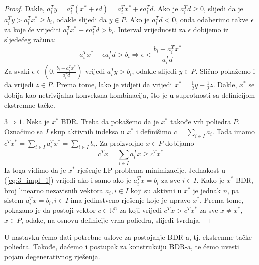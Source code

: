 \documentclass[b5paper, utf8, 11pt, colorlinks]{book}
\theoremstyle{definition}
\begin{document}
\begin{proof}
       Dakle, $a_i^T y = a_i^T (x^* + \epsilon d) = a_i^T x^* + \epsilon a_i^T d $. Ako je $a_i^T d \geq 0$, slijedi da je 
       $a_i^T y > a_i^Tx^* \geq b_i$, odakle slijedi da   $y \in  P$. Ako je $a_i^T d < 0$, onda odaberimo takve $\epsilon$ za koje će vrijediti $a_i^T x^* + \epsilon a_i^T d > b_i$. Interval   vrijednosti za $\epsilon$ dobijemo iz sljedećeg računa:
       $$ a_i^T x^* + \epsilon a_i^T d > b_i \Rightarrow \epsilon < \frac{b_i - a_i^T x^*}{a_i^T d}  $$
       Za svaki $\epsilon \in \left(0,  \frac{b_i - a_i^T x^*}{a_i^T d} \right)$ vrijedi $a_i^T y > b_i$, odakle slijedi $y \in P$. Slično pokažemo i da vrijedi $z \in P$. 
       Prema tome, lako je vidjeti da vrijedi $x^* = \frac{1}{2}y +\frac{1}{2} z$. Dakle, $x^*$ se dobija kao netrivijalna konveksna kombinacija, što je u suprotnosti sa definicijom ekstremne tačke. 
       
       $3 \Rightarrow 1$. Neka je $x^*$ BDR. Treba da pokažemo da je  $x^*$  takođe vrh poliedra $P$. Označimo sa $I$ skup aktivnih indeksa u $x^*$ i definišimo $c = \sum_{i \in I} a_i$.  Tada imamo 
       $ c^T x^* = \sum_{i \in I } a_i^T x^* = \sum_{i \in I} b_i$. Za proizvoljno $x \in P$ dobijamo
       \begin{equation}\label{eq:3_impl_1}
          c^T x = \sum_{i \in I} a_i^T x \geq c^T x^*  
       \end{equation}
     Iz toga vidimo da je $x^*$ rješenje LP problema minimizacije. Jednakost u (\ref{eq:3_impl_1}) vrijedi ako i samo ako je $a_i^T x = b_i$ za sve $i \in I$. Kako je $x^*$ BDR, broj linearno nezavisnih vektora $a_i, i \in I$ koji su  aktivni u $x^*$ je jednak $n$, pa sistem $a_i^T x = b_i, i \in I$ ima jedinstveno rješenje koje je upravo $x^*$. Prema tome, pokazano je da postoji vektor $c \in \mathbb{R}^n$ za koji vrijedi $c^T x > c^T x^*$ za sve $x \neq x^*$, $x \in P$, odake, na osnovu definicije vrha poliedra, slijedi tvrdnja. 
\end{proof} 
U nastavku ćemo dati potrebne uslove za postojanje BDR-a, tj. 
 ekstremne tačke poliedra. Takođe, daćemo i postupak za konstrukciju BDR-a, te ćemo uvesti pojam degenerativnog rješenja.
\end{document}
